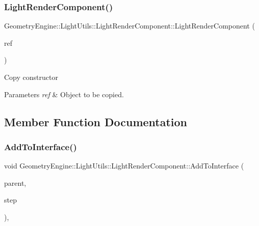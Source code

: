 \subsubsection{\texorpdfstring{LightRenderComponent()}{LightRenderComponent()}\hspace{0.1cm}{\footnotesize\ttfamily [2/2]}}
{\footnotesize\ttfamily Geometry\+Engine\+::\+Light\+Utils\+::\+Light\+Render\+Component\+::\+Light\+Render\+Component (\begin{DoxyParamCaption}\item[{const \mbox{\hyperlink{class_geometry_engine_1_1_light_utils_1_1_light_render_component}{Light\+Render\+Component}} \&}]{ref }\end{DoxyParamCaption})\hspace{0.3cm}{\ttfamily [inline]}}

Copy constructor 
\begin{DoxyParams}{Parameters}
{\em ref} & Object to be copied. \\
\hline
\end{DoxyParams}


\subsection{Member Function Documentation}
\mbox{\label{class_geometry_engine_1_1_light_utils_1_1_light_render_component_af6701af8d0d34f987852ab0faebefa86}} 
\subsubsection{\texorpdfstring{AddToInterface()}{AddToInterface()}}
{\footnotesize\ttfamily void Geometry\+Engine\+::\+Light\+Utils\+::\+Light\+Render\+Component\+::\+Add\+To\+Interface (\begin{DoxyParamCaption}\item[{\mbox{\hyperlink{class_geometry_engine_1_1_light_utils_1_1_light_component_manager}{Light\+Component\+Manager}} $\ast$}]{parent,  }\item[{\mbox{\hyperlink{namespace_geometry_engine_1_1_light_utils_ac3078de660742daceaa06bd9bc61d24a}{Light\+Render}}}]{step }\end{DoxyParamCaption})\hspace{0.3cm}{\ttfamily [protected]}, {\ttfamily [virtual]}}

